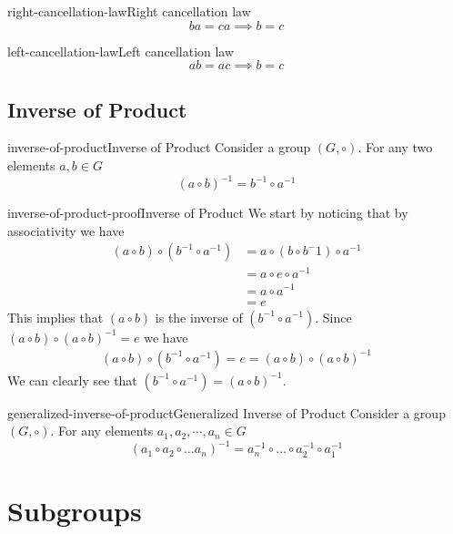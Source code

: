 \documentclass[preview]{standalone}
\begin{document}
\begin{snippettheorem}{right-cancellation-law}{Right cancellation law}
    \[
        ba = ca \implies b = c
    \]
\end{snippettheorem}

\begin{snippettheorem}{left-cancellation-law}{Left cancellation law}
    \[
        ab = ac \implies b = c
    \]
\end{snippettheorem}

\subsection{Inverse of Product}

\begin{snippettheorem}{inverse-of-product}{Inverse of Product}
    Consider a group \((G, \circ)\). For any two elements \(a,b \in G\)
    \[{(a \circ b)}^{-1} = b^{-1} \circ a^{-1}\]
\end{snippettheorem}

\begin{snippetproof}{inverse-of-product-proof}{Inverse of Product}
    We start by noticing that by associativity we have
    \begin{align*}
        (a \circ b) \circ (b^{-1} \circ a^{-1}) &= a \circ (b \circ b^-1) \circ a^{-1} \\
        &= a \circ e \circ a^{-1} \\
        &= a \circ a^{-1} \\
        &= e
    \end{align*}
    This implies that \((a \circ b)\) is the inverse of \((b^{-1} \circ a^{-1})\).
    Since \((a\circ b) \circ {(a \circ b)}^{-1} =e\) we have
    \begin{align*}
        (a \circ b) \circ (b^{-1} \circ a^{-1}) = e = (a\circ b) \circ {(a \circ b)}^{-1}
    \end{align*}
    We can clearly see that \((b^{-1} \circ a^{-1}) = {(a \circ b)}^{-1}\).
\end{snippetproof}

\begin{snippettheorem}{generalized-inverse-of-product}{Generalized Inverse of Product}
    Consider a group \((G, \circ)\). For any elements \(a_1,a_2,\cdots,a_n \in G\)
    \[
        (a_1 \circ a_2 \circ \dots a_n)^{-1}
        = a_n^{-1} \circ \dots \circ a_2^{-1} \circ a_1^{-1}
    \]
\end{snippettheorem}

\section{Subgroups}
\end{document}
